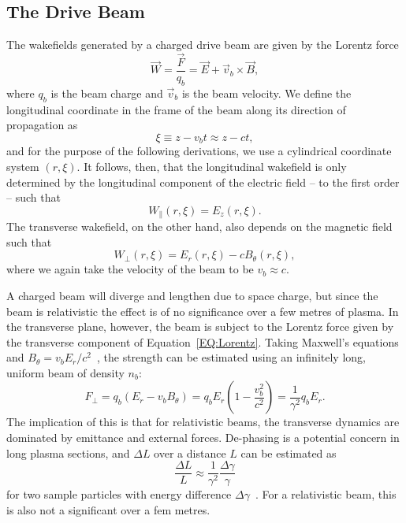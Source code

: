 \subsection{The Drive Beam}
\label{Int:BPI:Drive}

The wakefields generated by a charged drive beam are given by the Lorentz force
\begin{equation}
    \vec{W} = \frac{\vec{F}}{q_{b}} = \vec{E} + \vec{v}_{b} \times \vec{B}, \label{EQ:Lorentz}
\end{equation}
where $q_{b}$ is the beam charge and $\vec{v}_{b}$ is the beam velocity.
We define the longitudinal coordinate in the frame of the beam along its direction of propagation as
\begin{equation}
    \xi \equiv z - v_{b}t \approx z - ct, \label{EQ:Xi}
\end{equation}
and for the purpose of the following derivations, we use a cylindrical coordinate system $(r, \xi)$.
It follows, then, that the longitudinal wakefield is only determined by the longitudinal component of the electric field -- to the first order -- such that
\begin{equation}
    W_{\parallel}(r,\xi) = E_{z}(r,\xi). \label{EQ:Wz}
\end{equation}
The transverse wakefield, on the other hand, also depends on the magnetic field such that
\begin{equation}
    W_{\perp}(r,\xi) = E_{r}(r,\xi) - cB_{\theta}(r,\xi), \label{EQ:Wr}
\end{equation}
where we again take the velocity of the beam to be $v_{b} \approx c$.

A charged beam will diverge and lengthen due to space charge, but since the beam is relativistic the effect is of no significance over a few metres of plasma.
In the transverse plane, however, the beam is subject to the Lorentz force given by the transverse component of Equation~\ref{EQ:Lorentz}.
Taking Maxwell's equations and $B_{\theta} = v_{b}E_{r}/c^{2}$~\cite{schindl:1999}, the strength can be estimated using an infinitely long, uniform beam of density $n_{b}$:
\begin{equation}
    F_{\perp} = q_{b}(E_{r} - v_{b}B_{\theta})
              = q_{b}E_{r}\left(1 - \frac{v_{b}^{2}}{c^{2}}\right)
              = \frac{1}{\gamma^2}q_{b}E_{r}. \label{EQ:DeFocR}
\end{equation}
The implication of this is that for relativistic beams, the transverse dynamics are dominated by emittance and external forces.
De-phasing is a potential concern in long plasma sections, and $\Delta L$ over a distance $L$ can be estimated as
\begin{equation}
    \frac{\Delta L}{L} \approx \frac{1}{\gamma^{2}}\frac{\Delta\gamma}{\gamma} \label{EQ:DePhL}
\end{equation}
for two sample particles with energy difference $\Delta\gamma$~\cite{muggli:2017}.
For a relativistic beam, this is also not a significant over a fem metres.

